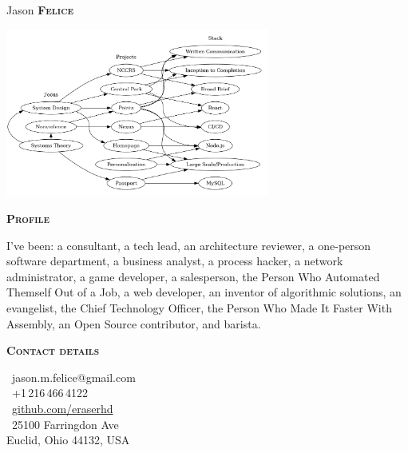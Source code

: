 \documentclass[11pt, a4paper]{article}
\newcommand{\headleft}[1]{\vspace*{3ex}\textsc{\textbf{#1}}\par%
    \vspace*{-1.5ex}\hrulefill\par\vspace*{0.7ex}}
\begin{document}
\setlength{\topskip}{0pt}
\setlength{\parindent}{0pt}
\setlength{\parskip}{0pt}
\setlength{\fboxsep}{0pt}
\pagestyle{empty}
\raggedbottom

\begin{minipage}[t]{0.33\textwidth} %
\colorbox{cvblue}{\begin{minipage}[t][5mm][t]{\textwidth}\null\hfill\null\end{minipage}}

\vspace{-.2ex} %
\colorbox{cvblue!90}{\color{white}  %
\textwidth\relax%
\begin{minipage}[t][293mm][t]{0.82\textwidth}
\raggedright
\vspace*{2.5ex}

\Large Jason \textbf{\textsc{Felice}} \normalsize 

\null\hfill\includegraphics[width=0.65\textwidth]{stack_graph.png}\hfill\null

\vspace*{0.5ex} %

\headleft{Profile}

I've been: a consultant, a tech lead, an architecture reviewer, a one-person
software department, a business analyst, a process hacker, a network administrator,
a game developer, a salesperson, the Person Who Automated Themself Out of a Job, a web
developer, an inventor of algorithmic solutions, an evangelist, the Chief Technology Officer,
the Person Who Made It Faster With Assembly, an Open Source contributor, and barista.

\headleft{Contact details}
\small %
\MVAt\ {\small jason.m.felice@gmail.com} \\[0.4ex]
\Mobilefone\ +1\,216\,466\,4122 \\[0.5ex]
\Mundus\ \href{https://github.com/eraserhd}{github.com/eraserhd} \\[0.1ex]
\Letter\ 25100 Farringdon Ave \\[0.5ex]
Euclid, Ohio 44132, USA
\normalsize


\end{minipage}}
\end{minipage}
\end{document}
